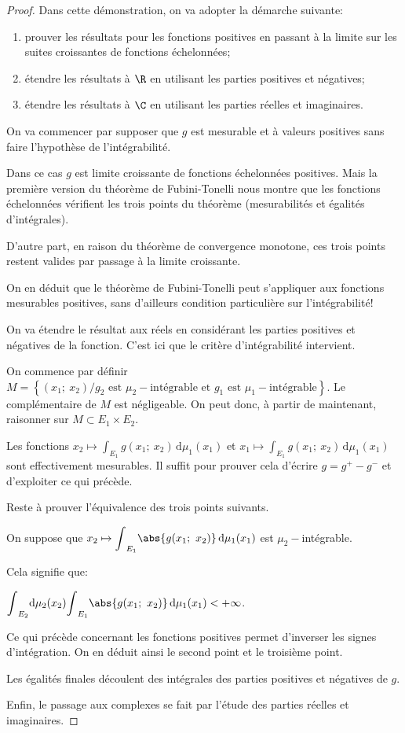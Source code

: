 \begin{proof}
Dans cette démonstration, on va adopter la démarche suivante:
\begin{enumerate}
\item prouver les résultats pour les fonctions positives en passant à la limite sur les suites croissantes de fonctions échelonnées;
\item étendre les résultats à $\R$ en utilisant les parties positives et négatives;
\item étendre les résultats à $\C$ en utilisant les parties réelles et imaginaires.
\end{enumerate}

On va commencer par supposer que $g$ est mesurable et à valeurs positives sans faire l'hypothèse de l'intégrabilité.

Dans ce cas $g$ est limite croissante de fonctions échelonnées positives. Mais la première version du théorème de Fubini-Tonelli nous montre que les fonctions échelonnées vérifient les trois points du théorème (mesurabilités et égalités d'intégrales).

D'autre part, en raison du théorème de convergence monotone, ces trois points restent valides par passage à la limite croissante. 

On en déduit que le théorème de Fubini-Tonelli peut s'appliquer aux fonctions mesurables positives, sans d'ailleurs condition particulière sur l'intégrabilité!

On va étendre le résultat aux réels en considérant les parties positives et négatives de la fonction. C'est ici que le critère d'intégrabilité intervient.

On commence par définir $M = \left\{ (x_1;~x_2)/ g_2 \text{ est $\mu_2-$intégrable et }g_1 \text{ est $\mu_1-$intégrable}\right \}$. Le complémentaire de $M$ est négligeable. On peut donc, à partir de maintenant, raisonner sur $M \subset E_1 \times E_2$.

Les fonctions $x_2 \mapsto \displaystyle{\int}_{E_1} g(x_1;~x_2) \, \mathrm d \mu_1(x_1)$ et $x_1 \mapsto \displaystyle{\int}_{E_1} g(x_1;~x_2) \, \mathrm d \mu_1(x_1)$ sont effectivement mesurables. Il suffit pour prouver cela d'écrire $g=g^{+}-g^{-}$ et d'exploiter ce qui précède.

Reste à prouver l'équivalence des trois points suivants.

On suppose que $x_2 \mapsto \displaystyle{\int}_{E_1} \abs{g(x_1;~x_2)} \, \mathrm d \mu_1(x_1)$ est $\mu_2-$intégrable. 

Cela signifie que:

$\displaystyle{\int}_{E_2} \mathrm d \mu_2(x_2) \displaystyle{\int}_{E_1} \abs{g(x_1;~x_2)} \, \mathrm d \mu_1(x_1) < +\infty$.

Ce qui précède concernant les fonctions positives permet d'inverser les signes d'intégration. On en déduit ainsi le second point et le troisième point.

Les égalités finales découlent des intégrales des parties positives et négatives de $g$.

Enfin, le passage aux complexes se fait par l'étude des parties réelles et imaginaires.
\end{proof}


